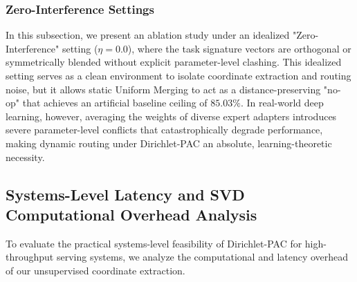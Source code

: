 \subsubsection{Zero-Interference Settings}
In this subsection, we present an ablation study under an idealized "Zero-Interference" setting ($\eta = 0.0$), where the task signature vectors are orthogonal or symmetrically blended without explicit parameter-level clashing. This idealized setting serves as a clean environment to isolate coordinate extraction and routing noise, but it allows static Uniform Merging to act as a distance-preserving "no-op" that achieves an artificial baseline ceiling of $85.03\%$. In real-world deep learning, however, averaging the weights of diverse expert adapters introduces severe parameter-level conflicts that catastrophically degrade performance, making dynamic routing under Dirichlet-PAC an absolute, learning-theoretic necessity.

\subsection{Systems-Level Latency and SVD Computational Overhead Analysis}
To evaluate the practical systems-level feasibility of Dirichlet-PAC for high-throughput serving systems, we analyze the computational and latency overhead of our unsupervised coordinate extraction. 

